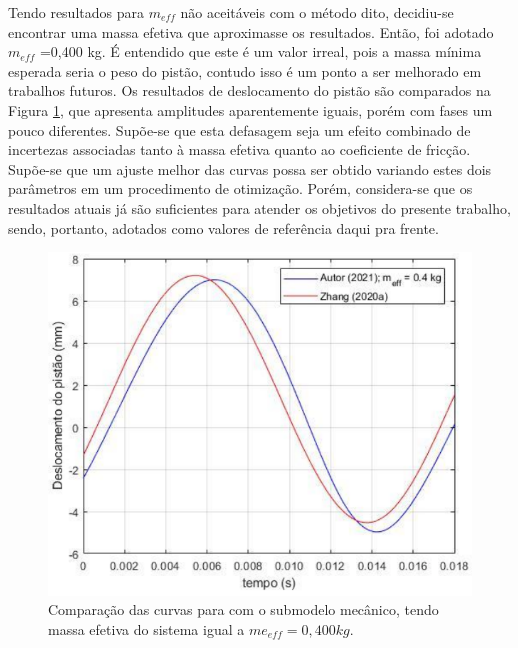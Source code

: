 	


Tendo resultados para $m_{eff}$ não aceitáveis com o método dito, decidiu-se encontrar uma massa efetiva que aproximasse os resultados. Então, foi adotado $m_{eff}$ =0,400 kg. É entendido que este é um valor irreal, pois a massa mínima esperada seria o peso do pistão, contudo isso é um ponto a ser melhorado em trabalhos futuros. Os resultados de deslocamento do pistão são comparados na Figura \ref{fig:comp_m_04}, que apresenta amplitudes aparentemente iguais, porém com fases um pouco diferentes. Supõe-se que esta defasagem seja um efeito combinado de incertezas associadas tanto à massa efetiva quanto ao coeficiente de fricção. Supõe-se que um ajuste melhor das curvas possa ser obtido variando estes dois parâmetros em um procedimento de otimização. Porém, considera-se que os resultados atuais já são suficientes para atender os objetivos do presente trabalho, sendo, portanto, adotados como valores de referência daqui pra frente.

 \begin{figure}[htb]
	\caption{\label{fig:comp_m_04}Comparação das curvas para com o submodelo mecânico, tendo massa efetiva do sistema igual a $me_{eff}=0,400kg$.}
	\begin{center}
		\includegraphics[scale=0.65]{images/m_04.png}
	\end{center}
\end{figure}

